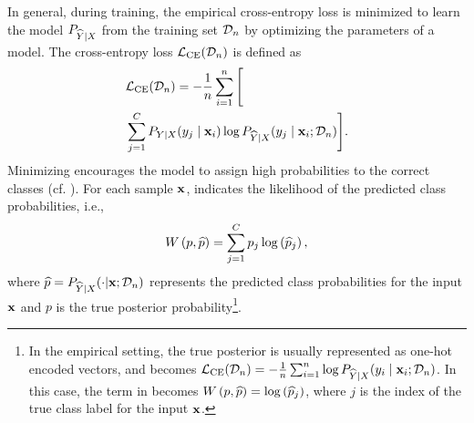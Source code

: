 In general, during training, the empirical cross-entropy loss is minimized to learn the model \(P_{\widehat{Y}|{X}}\) from the training set \(\mathcal{D}_n\) by optimizing the parameters of a model. The cross-entropy loss \(\mathcal{L}_{\mathrm{CE}}(\mathcal{D}_n)\) is defined as
\begin{align}
    \label{eq:cross_entropy}
     & \mathcal{L}_{\mathrm{CE}}(\mathcal{D}_n)
    \nonumber
    = -\frac{1}{n}\sum_{i=1}^{n}\Bigg[\\
                                    &\sum_{j=1}^{C}P_{Y|X}(y_j \mid \mathbf{x}_i)\log P_{\widehat{Y}|{X}}(y_j \mid \mathbf{x}_i;\mathcal{D}_n)\Bigg].
\end{align}
Minimizing  encourages the model to assign high probabilities to the correct classes (cf. \cite{shalev2014understanding,bishop2006pattern,goodfellow2016deep}).
For each sample \(\mathbf{x}\),  indicates the likelihood of the predicted class probabilities, i.e.,
\begin{align}
    \label{eq:cross_entropy_internal}
    \W=\sum_{j=1}^{C} p_{j}\log\left(\phat_{j}\right),
\end{align}
where \(\widehat{p}=P_{\widehat{Y}|{X}}(\cdot|\mathbf{x};\mathcal{D}_n)\) represents the predicted class probabilities for the input \(\mathbf{x}\) and \(p\) is the true posterior probability\footnote{In the empirical setting, the true posterior is usually represented as one-hot encoded vectors, and  becomes \(\mathcal{L}_{\mathrm{CE}}(\mathcal{D}_n)=-\frac{1}{n}\sum_{i=1}^{n}\log P_{\widehat{Y}|{X}}(y_i \mid \mathbf{x}_i;\mathcal{D}_n)\). In this case, the term in  becomes \(\W=\log\left(\phat_{j}\right)\), where \(j\) is the index of the true class label for the input \(\mathbf{x}\).}.

